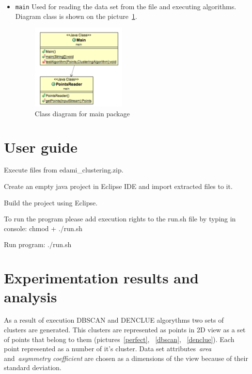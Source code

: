 \documentclass[12pt, a4paper, notitlepage, oneside]{article}
\begin{document}
\begin{itemize}
	\item \texttt{main} Used for reading the data set from the file and executing algorithms. Diagram class is shown on the picture~\ref{main}.


	\begin{figure}[!ht]
 	\centering
	\includegraphics[width=0.45\textwidth]{images/main_package.png}
 	\caption[]
	{Class diagram for main package}
\label{main}
	\end{figure}

\end{itemize}



\section*{User guide}


Execute files from edami\_clustering.zip.


\noindent 
Create an empty java project in Eclipse IDE and import extracted files to it. 

\noindent 
Build the project using Eclipse.

\noindent 
To run the program please add execution rights to the run.sh file by typing in console: 
	chmod + ./run.sh 


\noindent 
Run program:
 ./run.sh


\cleardoublepage

\section*{Experimentation results and analysis}

As a result of execution DBSCAN and DENCLUE algorythms two sets of clusters are generated. This clusters are represented as points in 2D view as a set of points that belong to them (pictures~\ref{perfect}, ~\ref{dbscan}, ~\ref{denclue}). Each point represented as a number of it’s cluster. Data set attributes~\textit{area} and~\textit{asymmetry coefficient} are chosen as a dimensions of the view because of their standard deviation. 
\end{document}
